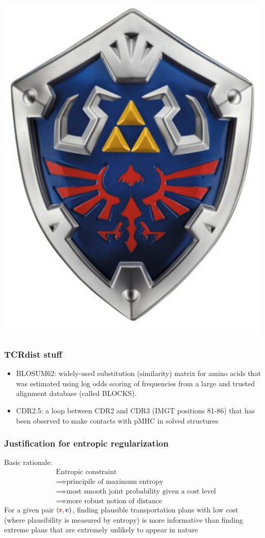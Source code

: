 \documentclass[mathserif,compress,xcolor={dvipsnames}]{beamer}
\renewcommand\;{\,}
\begin{document}
\begin{frame}
\begin{center}
\includegraphics[width=0.5\linewidth]{Images/shield.png}
\end{center}
\end{frame}


\begin{frame}\frametitle{TCRdist stuff}
\begin{itemize}
\item
BLOSUM62: widely-used substitution (similarity) matrix for amino acids that was estimated using log odds scoring of frequencies from a large and trusted alignment database (called BLOCKS).
\bigskip
\item
CDR2.5: a loop between CDR2 and CDR3 (IMGT positions 81-86) that has been observed to make
contacts with pMHC in solved structures
\end{itemize}
\end{frame}


\begin{frame}\frametitle{Justification for entropic regularization}
Basic rationale:
\begin{align*}
\; & \text{Entropic constraint} \\
& \implies \text{principile of maximum entropy} \\
& \implies \text{most smooth joint probability given a cost level} \\
& \implies \text{more robust notion of distance}
\end{align*}
For a given pair $({\color{red} \mathbf r}, {\color{blue} \mathbf c})$, finding plausible transportation plans with low cost (where plausibility
is measured by entropy) is more informative than finding extreme plans that are
extremely unlikely to appear in nature
\end{frame}
\end{document}
